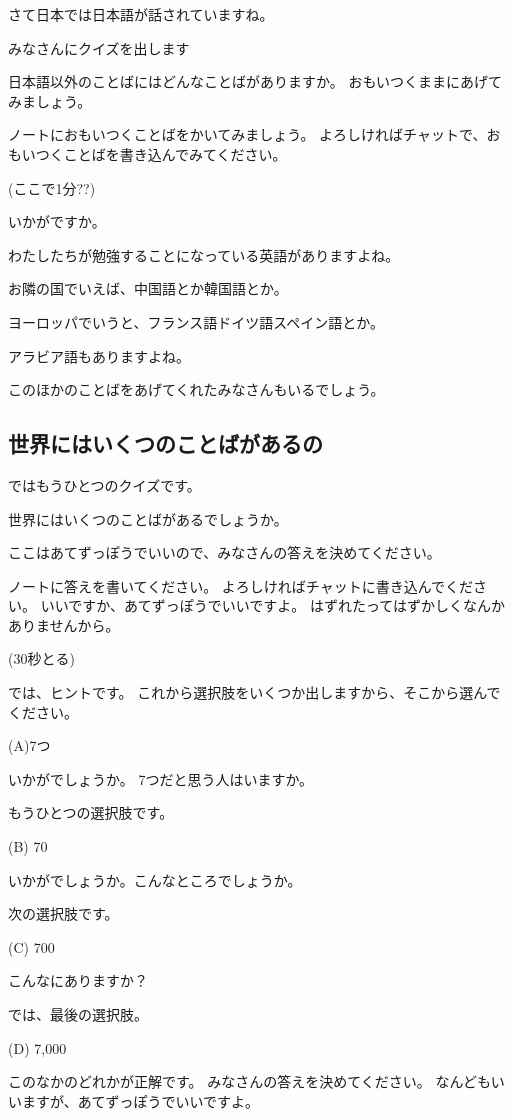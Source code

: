 \documentclass[12pt]{jlreq}
\begin{document}
さて日本では日本語が話されていますね。

みなさんにクイズを出します

日本語以外のことばにはどんなことばがありますか。
おもいつくままにあげてみましょう。

ノートにおもいつくことばをかいてみましょう。
よろしければチャットで、おもいつくことばを書き込んでみてください。

(ここで1分??)

いかがですか。

わたしたちが勉強することになっている英語がありますよね。

お隣の国でいえば、中国語とか韓国語とか。

ヨーロッパでいうと、フランス語ドイツ語スペイン語とか。


アラビア語もありますよね。

このほかのことばをあげてくれたみなさんもいるでしょう。

\subsection{世界にはいくつのことばがあるの}

ではもうひとつのクイズです。

世界にはいくつのことばがあるでしょうか。

ここはあてずっぽうでいいので、みなさんの答えを決めてください。

ノートに答えを書いてください。
よろしければチャットに書き込んでください。
いいですか、あてずっぽうでいいですよ。
はずれたってはずかしくなんかありませんから。

(30秒とる)

では、ヒントです。
これから選択肢をいくつか出しますから、そこから選んでください。

(A)7つ

いかがでしょうか。
7つだと思う人はいますか。

もうひとつの選択肢です。

(B) 70

いかがでしょうか。こんなところでしょうか。

次の選択肢です。

(C) 700

こんなにありますか？

では、最後の選択肢。

(D) 7,000


このなかのどれかが正解です。
みなさんの答えを決めてください。
なんどもいいますが、あてずっぽうでいいですよ。
\end{document}
